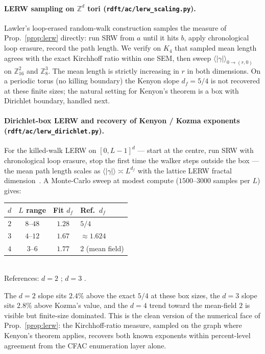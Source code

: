 \documentclass[10pt,a4paper,twocolumn]{article}
\theoremstyle{plain}
\theoremstyle{definition}
\begin{document}
\paragraph{LERW sampling on $\mathbb{Z}^d$ tori
(\texttt{rdft/ac/lerw\_scaling.py}).}
Lawler's loop-erased random-walk construction samples the measure of
Prop.~\ref{prop:lerw} directly: run SRW from $a$ until it hits $b$,
apply chronological loop erasure, record the path length. We verify
on $K_4$ that sampled mean length agrees with the exact Kirchhoff
ratio within one SEM, then sweep $\langle |\gamma|\rangle_{0 \to (r,
0)}$ on $\mathbb{Z}^2_{16}$ and $\mathbb{Z}^3_{8}$.  The mean length
is strictly increasing in $r$ in both dimensions.  On a periodic
torus (no killing boundary) the Kenyon slope $d_f = 5/4$ is not
recovered at these finite sizes; the natural setting for Kenyon's
theorem is a box with Dirichlet boundary, handled next.

\paragraph{Dirichlet-box LERW and recovery of Kenyon / Kozma
exponents (\texttt{rdft/ac/lerw\_dirichlet.py}).}
For the killed-walk LERW on $[0, L{-}1]^d$ --- start at the centre,
run SRW with chronological loop erasure, stop the first time the
walker steps outside the box --- the mean path length scales as
$\langle |\gamma| \rangle \asymp L^{d_f}$ with the lattice LERW
fractal dimension~\citep{Kenyon2000LERW, Kozma2007}.  A Monte-Carlo
sweep at modest compute ($1500$--$3000$ samples per $L$) gives:
\begin{center}
{\small
\begin{tabular}{@{}cccl@{}}
\toprule
$d$ & $L$ range & Fit $d_f$ & Ref.\ $d_f$ \\
\midrule
$2$ & $8$--$48$ & $1.28$ & $5/4$ \\
$3$ & $4$--$12$ & $1.67$ & $\approx 1.624$ \\
$4$ & $3$--$6$  & $1.77$ & $2$ (mean field) \\
\bottomrule
\end{tabular}
}
\\[2pt]
{\small References: $d=2$ \citep{Kenyon2000LERW}; $d=3$
\citep{Kozma2007, Wilson2010}.}
\end{center}
The $d = 2$ slope sits $2.4\%$ above the exact $5/4$ at these box
sizes, the $d = 3$ slope sits $2.8\%$ above Kozma's value, and the
$d = 4$ trend toward the mean-field $2$ is visible but finite-size
dominated.  This is the clean version of the numerical face of
Prop.~\ref{prop:lerw}: the Kirchhoff-ratio measure, sampled on the
graph where Kenyon's theorem applies, recovers both known exponents
within percent-level agreement from the CFAC enumeration layer
alone.
\end{document}
